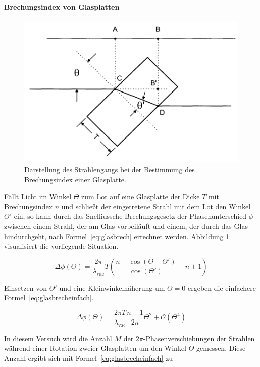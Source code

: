 \paragraph{Brechungsindex von Glasplatten}
\begin{figure}
\centering
\includegraphics[width=0.7\linewidth]{img/slab.png}
\caption{Darstellung des Strahlengangs bei der Bestimmung des Brechungsindex einer Glasplatte.  \cite{V64}}
\label{fig:slab}
\end{figure}

Fällt Licht im Winkel $\Theta$ zum Lot auf eine Glasplatte der Dicke $T$ mit Brechungsindex $n$ und schließt der eingetretene Strahl mit dem Lot den Winkel $\Theta'$ ein, so kann durch das Snelliussche Brechungsgesetz der Phasenunterschied $\phi$ zwischen einem Strahl, der am Glas vorbeiläuft und einem, der durch das Glas hindurchgeht, nach Formel~\eqref{eq:glasbrech} errechnet werden. Abbildung \ref{fig:slab} visualisiert die vorliegende Situation.

\begin{equation}
\Delta\phi(\Theta) = \frac{2\pi}{\lambda_\text{vac}}T\left(
\frac{n-\cos(\Theta - \Theta')}{\cos(\Theta')} - n+1\right)
\label{eq:glasbrech}
\end{equation}

Einsetzen von $\Theta'$ und eine Kleinwinkelnäherung um $\Theta = 0$ ergeben die einfachere Formel~\eqref{eq:glasbrecheinfach}.

\begin{equation}
\Delta\phi(\Theta) = \frac{2\pi T}{\lambda_\text{vac}}
\frac{n-1}{2n}\Theta^2 + \mathcal{O}(\Theta^4)
\label{eq:glasbrecheinfach}
\end{equation}

In diesem Versuch wird die Anzahl $M$ der $2\pi$-Phasenverschiebungen der Strahlen während einer Rotation zweier Glasplatten um den Winkel $\Theta$ gemessen. Diese Anzahl ergibt sich mit Formel~\eqref{eq:glasbrecheinfach} zu

